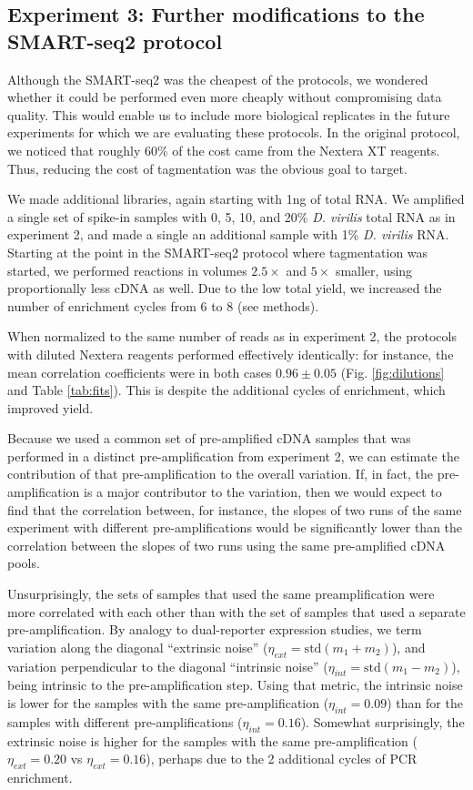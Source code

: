 \subsection{Experiment 3: Further modifications to the SMART-seq2 protocol}

Although the SMART-seq2 was the cheapest of the protocols, we wondered whether it could be performed even more cheaply without compromising data quality.  This would enable us to include more biological replicates in the future experiments for which we are evaluating these protocols.  In the original protocol, we noticed that roughly 60\% of the cost came from the Nextera XT reagents.  Thus, reducing the cost of tagmentation was the obvious goal to target.  

We made additional libraries, again starting with 1ng of total RNA.  We amplified a single set of spike-in samples with 0, 5, 10, and 20\% {\em D. virilis} total RNA as in experiment 2, and made a single an additional sample with 1\% {\em D. virilis} RNA. Starting at the point in the SMART-seq2 protocol where tagmentation was started, we performed reactions in volumes $2.5\times$ and $5\times$ smaller, using proportionally less cDNA as well.  Due to the low total yield, we increased the number of enrichment cycles from 6 to 8 (see methods). 

When normalized to the same number of reads as in experiment 2, the protocols with diluted Nextera reagents performed effectively identically: for instance, the mean correlation coefficients were in both cases $0.96 \pm 0.05$ (Fig. \ref{fig:dilutions} and Table \ref{tab:fits}).  This is despite the additional cycles of enrichment, which improved yield.

Because we used a common set of pre-amplified cDNA samples that was performed in a distinct pre-amplification from experiment 2, we can estimate the contribution of that pre-amplification to the overall variation. If, in fact, the pre-amplification is a major contributor to the variation, then we would expect to find that the correlation between, for instance, the slopes of two runs of the same experiment with different pre-amplifications would be significantly lower than the correlation between the slopes of two runs using the same pre-amplified cDNA pools. 

Unsurprisingly, the sets of samples that used the same preamplification were more correlated with each other than with the set of samples that used a separate pre-amplification.  By analogy to dual-reporter expression studies\cite{Elowitz:2002hb}, we term variation along the diagonal ``extrinsic noise'' ($\eta_{ext} = \mbox{std}(m_1 + m_2)$), and variation perpendicular to the diagonal ``intrinsic noise'' ($\eta_{int} = \mbox{std}(m_1 - m_2)$), being intrinsic to the pre-amplification step.  Using that metric, the intrinsic noise is lower for the samples with the same pre-amplification ($\eta_{int} =0.09$) than for the samples with different pre-amplifications ($\eta_{int} =0.16$). Somewhat surprisingly, the extrinsic noise is higher for the samples with the same pre-amplification ($\eta_{ext} = 0.20$ vs $\eta_{ext} = 0.16$), perhaps due to the 2 additional cycles of PCR enrichment.